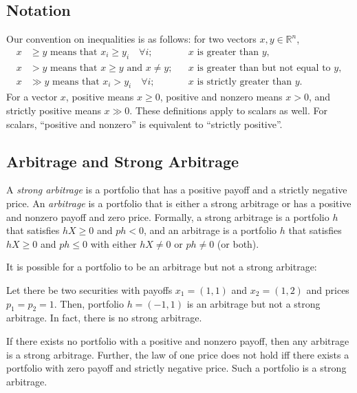 \documentclass[\topdir/lecture\_notes.tex]{subfiles}
\begin{document}
\subsection{Notation}
Our convention on inequalities is as follows: for two vectors \(x, y \in \mathbb{R}^{n}\),
\begin{align*}
x & \geq y \text{ means that } x_{i} \geq y_{i} \quad \forall i;&& x \text{ is greater than } y, \\
x & > y \text{ means that } x \geq y \text{ and } x \neq y;&& x \text{ is greater than but not equal to } y, \\
x & \gg y \text{ means that } x_{i}>y_{i} \quad \forall i;&& x \text{ is strictly greater than } y.
\end{align*}
For a vector \(x\), positive means \(x \geq 0\), positive and nonzero means \(x>0\), and strictly positive means \(x \gg 0\). These definitions apply to scalars as well. For scalars, ``positive and nonzero'' is equivalent to ``strictly positive''.

\subsection{Arbitrage and Strong Arbitrage}
A \emph{strong arbitrage} is a portfolio that has a positive payoff and a strictly negative price. An \emph{arbitrage} is a portfolio that is either a strong arbitrage or has a positive and nonzero payoff and zero price. Formally, a strong arbitrage is a portfolio \(h\) that satisfies \(h X \geq 0\) and \(p h<0\), and an arbitrage is a portfolio \(h\) that satisfies \(h X \geq 0\) and \(p h \leq 0\) with either \(h X \neq 0\) or \(p h \neq 0\) (or both).

It is possible for a portfolio to be an arbitrage but not a strong arbitrage:

\begin{example}\label{ex:arbitrage_not_strong}
Let there be two securities with payoffs \(x_{1}=(1,1)\) and \(x_{2}=(1,2)\) and prices \(p_{1}=p_{2}=1\). Then, portfolio \(h=(-1,1)\) is an arbitrage but not a strong arbitrage. In fact, there is no strong arbitrage.
\end{example}

If there exists no portfolio with a positive and nonzero payoff, then any arbitrage is a strong arbitrage. Further, the law of one price does not hold iff there exists a portfolio with zero payoff and strictly negative price. Such a portfolio is a strong arbitrage.
\end{document}
